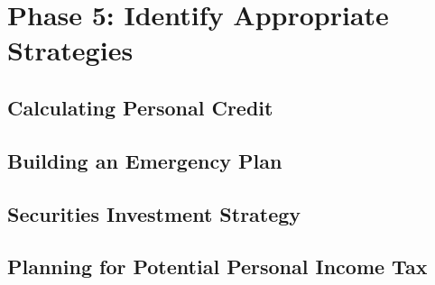 \chapter{Phase 5: Identify Appropriate Strategies}

\section{Calculating Personal Credit}
\section{Building an Emergency Plan}
\section{Securities Investment Strategy}
\section{Planning for Potential Personal Income Tax}
